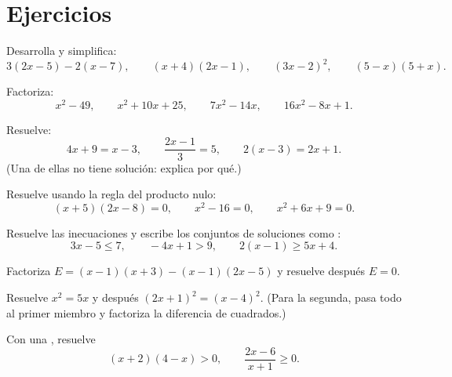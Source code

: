 \section{Ejercicios}

\begin{exercise}[$\star$]\label{exo:g10:algebra:1}
Desarrolla y simplifica:
\[
3(2x - 5) - 2(x - 7), \qquad
(x + 4)(2x - 1), \qquad
(3x - 2)^2, \qquad
(5 - x)(5 + x).
\]
\end{exercise}

\begin{exercise}[$\star$]\label{exo:g10:algebra:2}
Factoriza:
\[
x^2 - 49, \qquad
x^2 + 10x + 25, \qquad
7x^2 - 14x, \qquad
16x^2 - 8x + 1 .
\]
\end{exercise}

\begin{exercise}[$\star$]\label{exo:g10:algebra:3}
Resuelve:
\[
4x + 9 = x - 3, \qquad
\frac{2x - 1}{3} = 5, \qquad
2(x - 3) = 2x + 1 .
\]
(Una de ellas no tiene solución: explica por qué.)
\end{exercise}

\begin{exercise}[$\star$]\label{exo:g10:algebra:4}
Resuelve usando la regla del producto nulo:
\[
(x + 5)(2x - 8) = 0, \qquad
x^2 - 16 = 0, \qquad
x^2 + 6x + 9 = 0 .
\]
\end{exercise}

\begin{exercise}[$\star$]\label{exo:g10:algebra:5}
Resuelve las inecuaciones y escribe los conjuntos de soluciones como
:
\[
3x - 5 \leq 7, \qquad
-4x + 1 > 9, \qquad
2(x - 1) \geq 5x + 4 .
\]
\end{exercise}

\begin{exercise}[$\star\star$]\label{exo:g10:algebra:6}
Factoriza $E = (x - 1)(x + 3) - (x - 1)(2x - 5)$ y resuelve después
$E = 0$.
\end{exercise}

\begin{exercise}[$\star\star$]\label{exo:g10:algebra:7}
Resuelve $x^2 = 5x$ y después $(2x + 1)^2 = (x - 4)^2$. (Para la segunda,
pasa todo al primer miembro y factoriza la diferencia de cuadrados.)
\end{exercise}

\begin{exercise}[$\star\star$]\label{exo:g10:algebra:8}
Con una , resuelve
\[
(x + 2)(4 - x) > 0,
\qquad
\frac{2x - 6}{x + 1} \geq 0 .
\]
\end{exercise}

